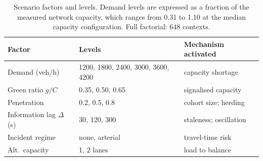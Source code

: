 \begin{table}[t]
\caption{Scenario factors and levels. Demand levels are expressed as a fraction
of the measured network capacity, which ranges from 0.31 to 1.10 at the
median capacity configuration. Full factorial: 648 contexts.}
\label{tab:factors}
\centering\footnotesize
\begin{tabular}{@{}l l l@{}}
\toprule
Factor & Levels & Mechanism activated\\
\midrule
Demand (veh/h) & 1200, 1800, 2400, 3000, 3600, 4200 & capacity shortage\\
Green ratio $g/C$ & 0.35, 0.50, 0.65 & signalised capacity\\
Penetration & 0.2, 0.5, 0.8 & cohort size; herding\\
Information lag $\Delta$ (s) & 30, 120, 300 & staleness; oscillation\\
Incident regime & none, arterial & travel-time risk\\
Alt.\ capacity & 1, 2 lanes & load to balance\\
\bottomrule
\end{tabular}
\end{table}